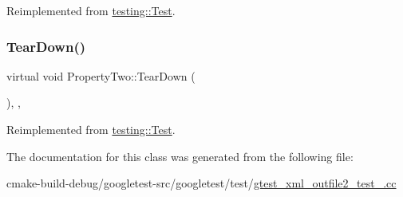 Reimplemented from \mbox{\hyperlink{classtesting_1_1Test_a190315150c303ddf801313fd1a777733}{testing\+::\+Test}}.

\mbox{\label{classPropertyTwo_aa4ffb2b9dddeba69f0f9baf133f06ef2}} 
\subsubsection{\texorpdfstring{TearDown()}{TearDown()}}
{\footnotesize\ttfamily virtual void Property\+Two\+::\+Tear\+Down (\begin{DoxyParamCaption}{ }\end{DoxyParamCaption})\hspace{0.3cm}{\ttfamily [inline]}, {\ttfamily [protected]}, {\ttfamily [virtual]}}



Reimplemented from \mbox{\hyperlink{classtesting_1_1Test_a5f0ab439802cbe0ef7552f1a9f791923}{testing\+::\+Test}}.



The documentation for this class was generated from the following file\+:\begin{DoxyCompactItemize}
\item 
cmake-\/build-\/debug/googletest-\/src/googletest/test/\mbox{\hyperlink{gtest__xml__outfile2__test___8cc}{gtest\+\_\+xml\+\_\+outfile2\+\_\+test\+\_\+.\+cc}}\end{DoxyCompactItemize}
